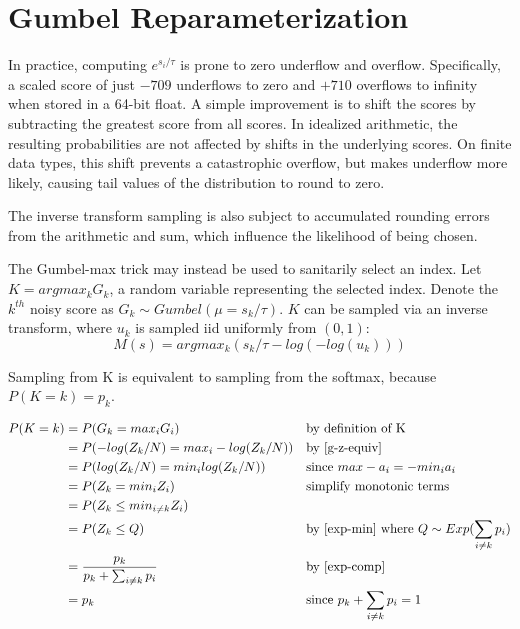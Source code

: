 \documentclass{article}
\begin{document}
\section{Gumbel Reparameterization}
\label{gumbel-reparam}

In practice, computing $e^{s_i / \tau}$ is prone to zero underflow and overflow. 
Specifically, a scaled score of just $-709$ underflows to zero and $+710$ overflows to infinity when stored in a 64-bit float. 
A simple improvement is to shift the scores by subtracting the greatest score from all scores.
In idealized arithmetic, the resulting probabilities are not affected by shifts in the underlying scores.
On finite data types, this shift prevents a catastrophic overflow, but makes underflow more likely, 
causing tail values of the distribution to round to zero. 

The inverse transform sampling is also subject to accumulated rounding errors from the arithmetic and sum, 
which influence the likelihood of being chosen.

The Gumbel-max trick may instead be used to sanitarily select an index.
Let $K = argmax_k G_k$, a random variable representing the selected index. 
Denote the $k^{th}$ noisy score as $G_k \sim Gumbel(\mu = s_k / \tau)$.
$K$ can be sampled via an inverse transform, where $u_k$ is sampled iid uniformly from $(0, 1)$:
\begin{equation}
    M(s) = argmax_k (s_k / \tau - log(-log(u_k)))
\end{equation}

\begin{theorem}
    \label{gumbel-equiv}
Sampling from K is equivalent to sampling from the softmax, because $P(K=k) = p_k$. \cite{Medina2020DuffAD}
\end{theorem}
\begin{align*}
    P(K = k) &= P(G_k = max_i G_i) &&\text{by definition of K} \\
    &= P(-log(Z_k / N) = max_i -log(Z_k / N)) &&\text{by \ref{g-z-equiv}}\\
    &= P(log(Z_k / N) = min_i log(Z_k / N)) &&\text{since } max -a_i = -min_i a_i \\
    &= P(Z_k = min_i Z_i) &&\text{simplify monotonic terms} \\
    &= P(Z_k \leq min_{i \neq k} Z_i) \\
    &= P(Z_k \leq Q) &&\text{by \ref{exp-min} where } Q \sim Exp(\sum_{i \neq k} p_i)\\
    &= \frac{p_k}{p_k + \sum_{i \neq k} p_i}  &&\text{by \ref{exp-comp}} \\
    &= p_k &&\text{since } p_k + \sum_{i \neq k} p_i = 1
\end{align*}
\end{document}
